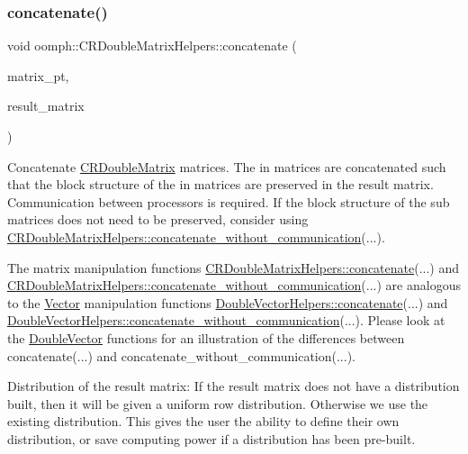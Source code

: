 \subsubsection{\texorpdfstring{concatenate()}{concatenate()}}
{\footnotesize\ttfamily void oomph\+::\+C\+R\+Double\+Matrix\+Helpers\+::concatenate (\begin{DoxyParamCaption}\item[{const \hyperlink{classoomph_1_1DenseMatrix}{Dense\+Matrix}$<$ \hyperlink{classoomph_1_1CRDoubleMatrix}{C\+R\+Double\+Matrix} $\ast$$>$ \&}]{matrix\+\_\+pt,  }\item[{\hyperlink{classoomph_1_1CRDoubleMatrix}{C\+R\+Double\+Matrix} \&}]{result\+\_\+matrix }\end{DoxyParamCaption})}



Concatenate \hyperlink{classoomph_1_1CRDoubleMatrix}{C\+R\+Double\+Matrix} matrices. The in matrices are concatenated such that the block structure of the in matrices are preserved in the result matrix. Communication between processors is required. If the block structure of the sub matrices does not need to be preserved, consider using \hyperlink{namespaceoomph_1_1CRDoubleMatrixHelpers_ab335593fd53dbb5162fd63f14db95377}{C\+R\+Double\+Matrix\+Helpers\+::concatenate\+\_\+without\+\_\+communication}(...). 

The matrix manipulation functions \hyperlink{namespaceoomph_1_1CRDoubleMatrixHelpers_aba5724bb1f89625f601045ba6ad139bf}{C\+R\+Double\+Matrix\+Helpers\+::concatenate}(...) and \hyperlink{namespaceoomph_1_1CRDoubleMatrixHelpers_ab335593fd53dbb5162fd63f14db95377}{C\+R\+Double\+Matrix\+Helpers\+::concatenate\+\_\+without\+\_\+communication}(...) are analogous to the \hyperlink{classoomph_1_1Vector}{Vector} manipulation functions \hyperlink{namespaceoomph_1_1DoubleVectorHelpers_ae5259ed3ae48ad417c743de0166884f8}{Double\+Vector\+Helpers\+::concatenate}(...) and \hyperlink{namespaceoomph_1_1DoubleVectorHelpers_ac69d6979ffbf4987684c0e025d107947}{Double\+Vector\+Helpers\+::concatenate\+\_\+without\+\_\+communication}(...). Please look at the \hyperlink{classoomph_1_1DoubleVector}{Double\+Vector} functions for an illustration of the differences between concatenate(...) and concatenate\+\_\+without\+\_\+communication(...).

Distribution of the result matrix\+: If the result matrix does not have a distribution built, then it will be given a uniform row distribution. Otherwise we use the existing distribution. This gives the user the ability to define their own distribution, or save computing power if a distribution has been pre-\/built.

